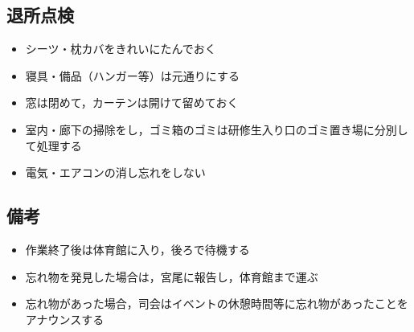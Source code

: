 \subsection{退所点検}
\begin{itemize}
\item シーツ・枕カバをきれいにたんでおく
\item 寝具・備品（ハンガー等）は元通りにする
\item 窓は閉めて，カーテンは開けて留めておく
\item 室内・廊下の掃除をし，ゴミ箱のゴミは研修生入り口のゴミ置き場に分別して処理する
\item 電気・エアコンの消し忘れをしない
\end{itemize}


\subsection{備考}
\begin{itemize}
  \item 作業終了後は体育館に入り，後ろで待機する
  \item 忘れ物を発見した場合は，宮尾に報告し，体育館まで運ぶ
  \item 忘れ物があった場合，司会はイベントの休憩時間等に忘れ物があったことをアナウンスする
\end{itemize}

%


